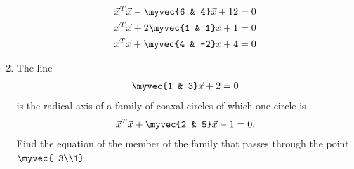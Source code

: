 \begin{enumerate}[label=\arabic*.,ref=\thesubsection.\theenumi]
\begin{align}
\vec{x}^T\vec{x}-\myvec{6 & 4}\vec{x}+12 = 0
\\
\vec{x}^T\vec{x}+2\myvec{1 & 1}\vec{x}+1 = 0
\\
\vec{x}^T\vec{x}+\myvec{4 & -2}\vec{x}+4 = 0
\end{align}
\item The line 
\begin{align}
\myvec{1 & 3}\vec{x}+2 = 0
\end{align}
is the radical axis of a family of coaxal circles of which one circle is
\begin{align}
\vec{x}^T\vec{x}+\myvec{2 & 5}\vec{x}-1 = 0.
\end{align}
Find the equation of the member of the family that passes through the point $\myvec{-3\\1}$.
\end{enumerate}
